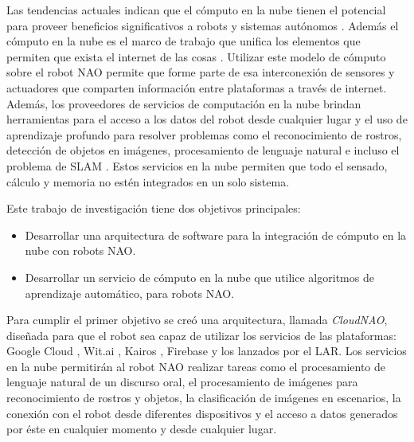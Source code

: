 
Las tendencias actuales indican que 
el cómputo en la nube tienen el potencial para
proveer beneficios significativos a robots y
sistemas autónomos \cite{benkehoesachinpatilpieterabbeelkengoldberg2014}.
Además el cómputo en la nube es el marco de trabajo que
unifica los elementos que permiten que exista el
internet de las cosas \cite{jayavardhanagubbiarajkumarbuyyabslavenmarusicamarimuthupalaniswamia2013}. Utilizar este modelo de cómputo sobre el robot NAO permite
que forme parte de esa interconexión de sensores y actuadores que comparten información entre plataformas
a través de internet. Además, los proveedores de servicios de 
computación en la nube brindan herramientas para el acceso 
a los datos del robot desde cualquier lugar y el uso de 
aprendizaje profundo para resolver problemas 
como el reconocimiento de rostros, detección de objetos en
imágenes, procesamiento de lenguaje natural e incluso el 
problema de SLAM \cite{tateno2017cnn}.
Estos servicios en la nube permiten que
todo el sensado, cálculo y memoria no estén
integrados en un solo sistema.

Este trabajo de investigación tiene dos objetivos principales:

\begin{itemize}
    \item Desarrollar una arquitectura de software para la
integración de cómputo en la nube con robots NAO.
    \item Desarrollar un servicio de cómputo en la nube que
utilice algoritmos de aprendizaje automático, para robots NAO.
\end{itemize}

Para cumplir el primer objetivo se creó una arquitectura, llamada \textit{CloudNAO}, diseñada para que el robot sea capaz de utilizar los servicios
de las plataformas: Google Cloud \cite{googlevision2018}, Wit.ai \cite{witaidocs2018}, Kairos \cite{kairosdevdocs2018}, Firebase \cite{firebasedocs2018}
y los lanzados por el LAR.
Los servicios en la nube permitirán al robot NAO
realizar tareas como el procesamiento de lenguaje
natural de un discurso oral, el procesamiento 
de imágenes para reconocimiento de rostros
y objetos, la clasificación de
imágenes en escenarios, la conexión con el robot desde diferentes dispositivos y el acceso a datos generados por
éste en cualquier momento y desde cualquier lugar.

